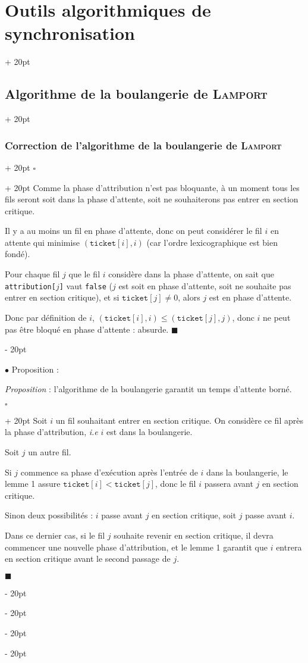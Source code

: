 \documentclass[a4paper, 12pt, twoside]{article}
\renewcommand{\le}{\leqslant}
\newcommand{\ind}[1][20pt]{\advance\leftskip + #1}
\newcommand{\deind}[1][20pt]{\advance\leftskip - #1}
\newenvironment{indt}[2][20pt]{#2 \par \ind[#1]}{\par \deind} %
\newenvironment{proof}[1][{}]{\begin{indt}{$\square$ #1}}{$\blacksquare$ \end{indt}}
\begin{document}
\begin{indt}{\section{Outils algorithmiques de synchronisation}}
\begin{indt}{\subsection{Algorithme de la boulangerie de \textsc{Lamport}}}
\begin{indt}{\subsubsection{Correction de l'algorithme de la boulangerie de \textsc{Lamport}}}
\begin{proof}
                    Comme la phase d'attribution n'est pas bloquante, à un moment tous les fils seront soit dans la phase d'attente, soit ne souhaiterons pas entrer en section critique.

                    Il y a au moins un fil en phase d'attente, donc on peut considérer le fil $i$ en attente qui minimise $(\mathtt{ticket}[i], i)$ (car l'ordre lexicographique est bien fondé).

                    Pour chaque fil $j$ que le fil $i$ considère dans la phase d'attente, on sait que \texttt{attribution[$j$]} vaut \texttt{false} ($j$ est soit en phase d'attente, soit ne souhaite pas entrer en section critique), et si $\mathtt{ticket}[j] \neq 0$, alors $j$ est en phase d'attente.

                    Donc par définition de $i$, $(\mathtt{ticket}[i], i) \le (\mathtt{ticket}[j], j)$, donc $i$ ne peut pas être bloqué en phase d'attente : absurde.
                \end{proof}

                \vspace{12pt}
                
                $\bullet$ Proposition :

                \begin{emphBox}
                    \textit{Proposition} :
                    l'algorithme de la boulangerie garantit un temps d'attente borné.
                \end{emphBox}

                \vspace{6pt}
                
                \begin{proof}
                    Soit $i$ un fil souhaitant entrer en section critique. On considère ce fil après la phase d'attribution, \textit{i.e} $i$ est dans la boulangerie.

                    Soit $j$ un autre fil.

                    Si $j$ commence sa phase d'exécution après l'entrée de $i$ dans la boulangerie, le lemme 1 assure $\mathtt{ticket}[i] < \mathtt{ticket}[j]$, donc le fil $i$ passera avant $j$ en section critique.

                    Sinon deux possibilités : $i$ passe avant $j$ en section critique, soit $j$ passe avant $i$.

                    Dans ce dernier cas, si le fil $j$ souhaite revenir en section critique, il devra commencer une nouvelle phase d'attribution, et le lemme 1 garantit que $i$ entrera en section critique avant le second passage de $j$.


\end{proof}
\end{indt}
\end{indt}
\end{indt}
\end{document}
